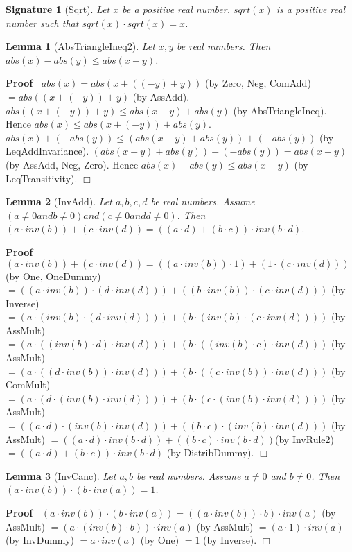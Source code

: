 \documentclass{article}
\newenvironment{forthel}{\begin{leftbar}}{\end{leftbar}}
\newenvironment{proof}{\noindent\textbf{Proof\ }}{\hspace*{\fill}$\Box$\medskip}
\newtheorem{lemma}{Lemma}
\newtheorem{signature}{Signature}
\newcommand{\dotequal}{=}
\begin{document}
\begin{forthel}
	
	
	\begin{signature}[Sqrt]
	Let $x$ be a positive real number. $sqrt(x)$ is a positive real number such that $sqrt(x) \cdot sqrt(x) = x$.
	\end{signature}
	
	\begin{lemma}[AbsTriangleIneq2]
	Let $x,y$ be real numbers. Then $abs(x) - abs(y) \leq abs(x - y)$.
	\end{lemma}
	\begin{proof}
	$abs(x) \dotequal abs(x + ((-y) + y))$ (by Zero, Neg, ComAdd)
	$\dotequal abs((x + (-y)) + y)$ (by AssAdd).
	$abs((x + (-y)) + y) \leq abs(x - y) + abs(y)$ (by AbsTriangleIneq).
	Hence $abs(x) \leq abs(x + (-y)) + abs(y)$.
	$abs(x) + (-abs(y)) \leq (abs(x - y) + abs(y)) + (-abs(y))$ (by LeqAddInvariance).
	$(abs(x - y) + abs(y)) + (-abs(y)) = abs(x - y)$ (by AssAdd, Neg, Zero).
	Hence $abs(x) - abs(y) \leq abs(x - y)$ (by LeqTransitivity).
	\end{proof}
	
	
	\begin{lemma}[InvAdd]
	Let $a,b,c,d$ be real numbers. Assume $(a \neq 0 and b \neq 0) and (c \neq 0 and d \neq 0)$. 
	Then $(a \cdot inv(b)) + (c \cdot inv(d)) = ((a \cdot d) + (b \cdot c)) \cdot inv(b \cdot d)$.
	\end{lemma}
	\begin{proof}
	$(a \cdot inv(b)) + (c \cdot inv(d)) \dotequal ((a \cdot inv(b)) \cdot 1) + (1 \cdot (c \cdot inv(d)))$ (by One, OneDummy)
	$\dotequal ((a \cdot inv(b)) \cdot (d \cdot inv(d))) + ((b \cdot inv(b)) \cdot (c \cdot inv(d)))$ (by Inverse)
	$\dotequal (a \cdot (inv(b) \cdot (d \cdot inv(d)))) + (b \cdot (inv(b) \cdot (c \cdot inv(d))))$ (by AssMult)
	$\dotequal (a \cdot ((inv(b) \cdot d) \cdot inv(d))) + (b \cdot ((inv(b) \cdot c) \cdot inv(d)))$ (by AssMult)
	$\dotequal (a \cdot ((d \cdot inv(b)) \cdot inv(d))) + (b \cdot ((c \cdot inv(b)) \cdot inv(d)))$ (by ComMult)
	$\dotequal (a \cdot (d \cdot (inv(b) \cdot inv(d)))) + (b \cdot (c \cdot (inv(b) \cdot inv(d))))$ (by AssMult)
	$\dotequal ((a \cdot d) \cdot (inv(b) \cdot inv(d))) + ((b \cdot c) \cdot (inv(b) \cdot inv(d)))$ (by AssMult)
	$\dotequal ((a \cdot d) \cdot inv(b \cdot d)) + ((b \cdot c) \cdot inv(b \cdot d)) $(by InvRule2)
	$\dotequal ((a \cdot d) + (b \cdot c)) \cdot inv(b \cdot d)$ (by DistribDummy).
	\end{proof}
	
	
	
	\begin{lemma}[InvCanc]
	Let $a, b$ be real numbers. Assume $a \neq 0$ and $b \neq 0$.
	Then $(a \cdot inv(b)) \cdot (b \cdot inv(a)) = 1$.
	\end{lemma}
	\begin{proof}
	$(a \cdot inv(b)) \cdot (b \cdot inv(a)) \dotequal ((a \cdot inv(b)) \cdot b) \cdot inv(a)$ (by AssMult)
	$\dotequal (a \cdot (inv(b) \cdot b)) \cdot inv(a)$ (by AssMult)
	$\dotequal (a \cdot 1) \cdot inv(a)$ (by InvDummy)
	$\dotequal a \cdot inv(a)$ (by One)
	$\dotequal 1$ (by Inverse).
	\end{proof}
	

\end{forthel}
\end{document}
